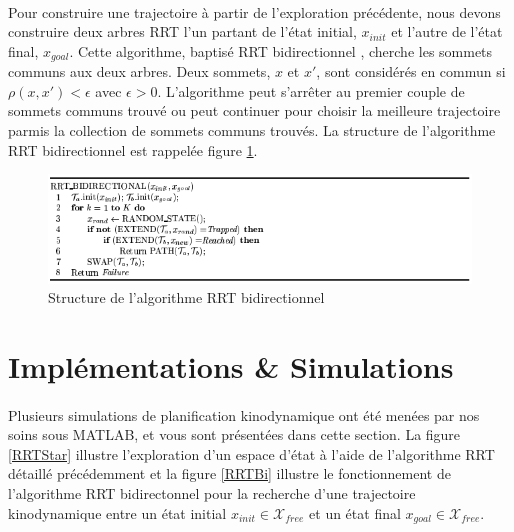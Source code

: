 \documentclass[12pt]{article}
\begin{document}
\paragraph{}
Pour construire une trajectoire à partir de l'exploration précédente, nous devons construire deux arbres RRT l'un partant de l'état initial, $x_{init}$ et l'autre de l'état final, $x_{goal}$. Cette algorithme, baptisé \og RRT bidirectionnel \fg{}, cherche les sommets communs aux deux arbres. Deux sommets, $x$ et $x'$, sont considérés en commun si $\rho(x,x')<\epsilon$ avec $\epsilon>0$. L'algorithme peut s'arrêter au premier couple de sommets communs trouvé ou peut continuer pour choisir la meilleure trajectoire parmis la collection de sommets communs trouvés. La structure de l'algorithme RRT bidirectionnel est rappelée figure \ref{RRTbi}.

\begin{figure}[H]
\centering
\includegraphics[scale=0.65]{img/RRTbi.png}
\caption{Structure de l'algorithme RRT bidirectionnel}
\label{RRTbi}
\end{figure}

\section{Implémentations \& Simulations}

\paragraph{}
Plusieurs simulations de planification kinodynamique ont été menées par nos soins sous MATLAB, et vous sont présentées dans cette section. La figure \ref{RRTStar} illustre l'exploration d'un espace d'état à l'aide de l'algorithme RRT détaillé précédemment et la figure \ref{RRTBi} illustre le fonctionnement de l'algorithme RRT bidirectonnel pour la recherche d'une trajectoire kinodynamique entre un état initial $x_{init} \in \mathcal{X}_{free}$ et un état final $x_{goal} \in \mathcal{X}_{free}$.
\end{document}
